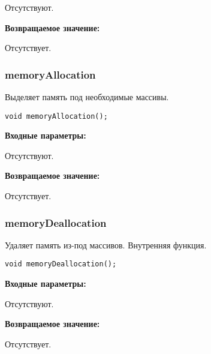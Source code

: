\documentclass[a4paper,12pt]{article}
\begin{document}
Отсутствуют.

\textbf{Возвращаемое значение:}

Отсутствует.


\subsubsection{memoryAllocation}\label{memoryAllocation}

Выделяет память под необходимые массивы.


\begin{lstlisting}[label=code_syntax_memoryAllocation,caption=Синтаксис]
void memoryAllocation();
\end{lstlisting}

\textbf{Входные параметры:}

Отсутствуют.

\textbf{Возвращаемое значение:}

Отсутствует.


\subsubsection{memoryDeallocation}\label{memoryDeallocation}

Удаляет память из-под массивов. Внутренняя функция.


\begin{lstlisting}[label=code_syntax_memoryDeallocation,caption=Синтаксис]
void memoryDeallocation();
\end{lstlisting}

\textbf{Входные параметры:}

Отсутствуют.

\textbf{Возвращаемое значение:}

Отсутствует.

\end{document}
